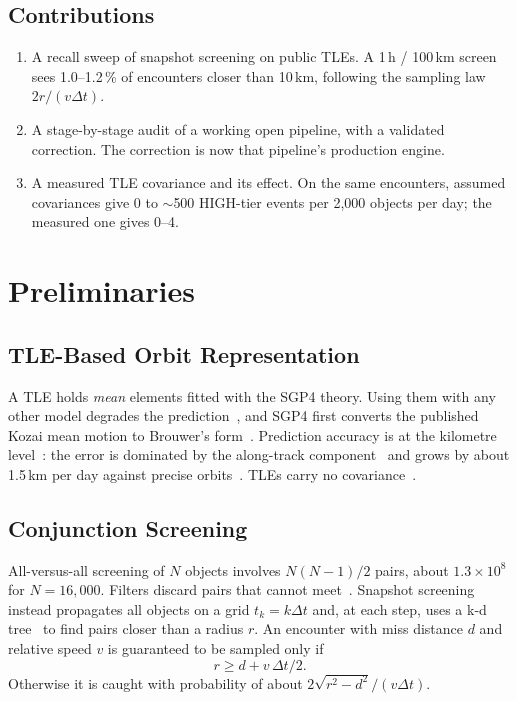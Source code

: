 \documentclass[conference]{IEEEtran}
\begin{document}
\subsection{Contributions}
\begin{enumerate}
\item A recall sweep of snapshot screening on public TLEs. A 1\,h / 100\,km screen sees 1.0--1.2\,\% of encounters closer than 10\,km, following the sampling law $2r/(v\Delta t)$.
\item A stage-by-stage audit of a working open pipeline, with a validated correction. The correction is now that pipeline's production engine.
\item A measured TLE covariance and its effect. On the same encounters, assumed covariances give 0 to $\sim$500 HIGH-tier events per 2,000 objects per day; the measured one gives 0--4.
\end{enumerate}

\section{Preliminaries}

\subsection{TLE-Based Orbit Representation}
A TLE holds \emph{mean} elements fitted with the SGP4 theory. Using them with any other model degrades the prediction~\cite{hoots1980str3}, and SGP4 first converts the published Kozai mean motion to Brouwer's form~\cite{hoots1980str3,vallado2006revisiting}. Prediction accuracy is at the kilometre level~\cite{vallado2006revisiting}: the error is dominated by the along-track component~\cite{flohrer2009improving} and grows by about 1.5\,km per day against precise orbits~\cite{levit2011improved}. TLEs carry no covariance~\cite{flohrer2009improving,nasa_ca_handbook2020}.

\subsection{Conjunction Screening}
All-versus-all screening of $N$ objects involves $N(N-1)/2$ pairs, about $1.3\times10^8$ for $N=16{,}000$. Filters discard pairs that cannot meet~\cite{hoots1984,woodburn2009}. Snapshot screening instead propagates all objects on a grid $t_k=k\Delta t$ and, at each step, uses a k-d tree~\cite{bentley1975} to find pairs closer than a radius $r$. An encounter with miss distance $d$ and relative speed $v$ is guaranteed to be sampled only if
\begin{equation}
r \ge d + v\,\Delta t/2 .
\label{eq:capture}
\end{equation}
Otherwise it is caught with probability of about $2\sqrt{r^2-d^2}/(v\Delta t)$.
\end{document}
